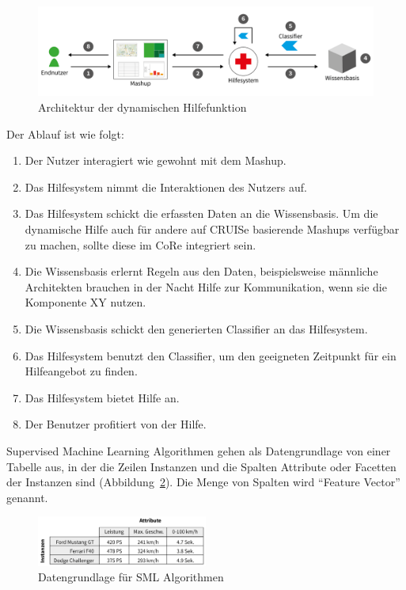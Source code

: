 \documentclass[
	headsepline,
	footsepline,
	fontsize=12pt,
	bibliography=totoc
]{scrbook}
\begin{document}
\begin{figure}[htbp]
   \centering
   \includegraphics[width=\textwidth]{images/konzeption-architektur-dynhilfe.png}
   \caption{Architektur der dynamischen Hilfefunktion}
   \label{figure:architektur-dynhilfe}
\end{figure}

Der Ablauf ist wie folgt:

\begin{enumerate}
	\item Der Nutzer interagiert wie gewohnt mit dem Mashup.
	\item Das Hilfesystem nimmt die Interaktionen des Nutzers auf.
	\item Das Hilfesystem schickt die erfassten Daten an die Wissensbasis. Um die dynamische Hilfe auch für andere auf CRUISe basierende Mashups verfügbar zu machen, sollte diese im CoRe integriert sein.
	\item Die Wissensbasis erlernt Regeln aus den Daten, beispielsweise männliche Architekten brauchen in der Nacht Hilfe zur Kommunikation, wenn sie die Komponente XY nutzen.
	\item Die Wissensbasis schickt den generierten Classifier an das Hilfesystem.
	\item Das Hilfesystem benutzt den Classifier, um den geeigneten Zeitpunkt für ein Hilfeangebot zu finden.
	\item Das Hilfesystem bietet Hilfe an.
	\item Der Benutzer profitiert von der Hilfe.
\end{enumerate}

Supervised Machine Learning Algorithmen gehen als Datengrundlage von einer Tabelle aus, in der die Zeilen Instanzen und die Spalten Attribute oder Facetten der Instanzen sind (Abbildung~\ref{figure:sml-daten}). Die Menge von Spalten wird \enquote{Feature Vector} genannt. 

\begin{figure}[htbp]
   \centering
   \includegraphics[width=0.5\textwidth]{images/konzeption-sml-daten.png}
   \caption{Datengrundlage für SML Algorithmen}
   \label{figure:sml-daten}
\end{figure}
\end{document}
